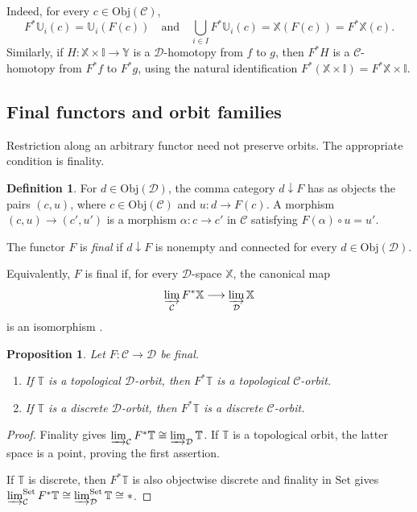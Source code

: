 \documentclass[12pt]{amsart}
\newtheorem{prop}[teo]{Proposition}
\theoremstyle{definition}
\newtheorem{defi}[teo]{Definition}
\theoremstyle{remark}
\numberwithin{figure}{section}%
\newcommand{\CC}{\mathcal{C}}
\newcommand{\Dc}{\mathcal{D}}
\newcommand{\X}{\mathbb{X}}
\newcommand{\Y}{\mathbb{Y}}
\newcommand{\T}{\mathbb{T}}
\newcommand{\Obj}{\mathrm{Obj}}
\newcommand{\Set}{\mathrm{Set}}
\newcommand{\Uu}{\mathbb{U}}
\begin{document}
Indeed, for every $c\in\Obj(\CC)$,
\[
F^*\Uu_i(c)=\Uu_i(F(c))
\quad\text{and}\quad
\bigcup_{i\in I}F^*\Uu_i(c)=\X(F(c))=F^*\X(c).
\]
Similarly, if $H\colon\X\times\mathbb I\to\Y$ is a $\Dc$-homotopy from
$f$ to $g$, then $F^*H$ is a $\CC$-homotopy from $F^*f$ to $F^*g$,
using the natural identification
$F^*(\X\times\mathbb I)=F^*\X\times\mathbb I$.

\subsection{Final functors and orbit families}

Restriction along an arbitrary functor need not preserve orbits. The
appropriate condition is finality.

\begin{defi}\label{def:comma-d-F}
For $d\in\Obj(\Dc)$, the comma category $d\downarrow F$ has as objects
the pairs $(c,u)$, where $c\in\Obj(\CC)$ and
$u\colon d\to F(c)$. A morphism
$(c,u)\to(c',u')$ is a morphism $\alpha\colon c\to c'$ in $\CC$
satisfying $F(\alpha)\circ u=u'$.

The functor $F$ is \emph{final} if $d\downarrow F$ is nonempty and
connected for every $d\in\Obj(\Dc)$.
\end{defi}

Equivalently, \(F\) is final if, for every \(\Dc\)-space \(\X\), the
canonical map
\[
\varinjlim_{\CC}F^*\X\longrightarrow\varinjlim_{\Dc}\X
\]
is an isomorphism \cite[Chapter~IX, Section~3]{MacLaneCategories}.

\begin{prop}
\label{prop:final-colimits}
\label{prop:final-preserves-top-orbits}
\label{prop:final-preserves-disc-orbits}
Let $F\colon\CC\to\Dc$ be final.
\begin{enumerate}
    \item If $\T$ is a topological $\Dc$-orbit, then $F^*\T$ is a
    topological $\CC$-orbit.

    \item If $\T$ is a discrete $\Dc$-orbit, then $F^*\T$ is a
    discrete $\CC$-orbit.
\end{enumerate}
\end{prop}

\begin{proof}
Finality gives
$\varinjlim_{\CC}F^*\T\cong\varinjlim_{\Dc}\T$. If $\T$ is a
topological orbit, the latter space is a point, proving the first
assertion.

If $\T$ is discrete, then $F^*\T$ is also objectwise discrete and
finality in $\Set$ gives
$\varinjlim_{\CC}^{\Set}F^*\T
\cong\varinjlim_{\Dc}^{\Set}\T\cong *$.
\end{proof}
\end{document}
